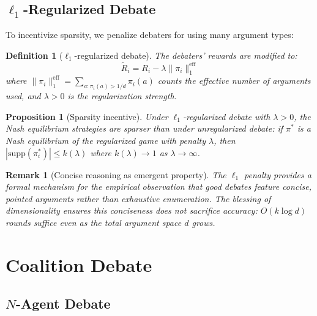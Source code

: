 \documentclass[11pt,a4paper]{article}
\newtheorem{proposition}[theorem]{Proposition}
\newtheorem{definition}[theorem]{Definition}
\newtheorem{remark}[theorem]{Remark}
\newcommand{\norm}[1]{\|#1\|}
\begin{document}
\subsection{$\ell_1$-Regularized Debate}

To incentivize sparsity, we penalize debaters for using many argument types:

\begin{definition}[$\ell_1$-regularized debate]
The debaters' rewards are modified to:
\begin{equation}\label{eq:l1-debate}
    \tilde{R}_i = R_i - \lambda \norm{\pi_i}_1^{\text{eff}}
\end{equation}
where $\norm{\pi_i}_1^{\text{eff}} = \sum_{a : \pi_i(a) > 1/d} \pi_i(a)$
counts the effective number of arguments used, and $\lambda > 0$ is the
regularization strength.
\end{definition}

\begin{proposition}[Sparsity incentive]
\label{prop:l1-incentive}
Under $\ell_1$-regularized debate with $\lambda > 0$, the Nash
equilibrium strategies are sparser than under unregularized debate:
if $\pi^*$ is a Nash equilibrium of the regularized game with penalty
$\lambda$, then $|\text{supp}(\pi_i^*)| \leq k(\lambda)$ where
$k(\lambda) \to 1$ as $\lambda \to \infty$.
\end{proposition}

\begin{remark}[Concise reasoning as emergent property]
The $\ell_1$ penalty provides a formal mechanism for the empirical
observation that good debates feature concise, pointed arguments rather
than exhaustive enumeration. The blessing of dimensionality ensures
this conciseness does not sacrifice accuracy: $O(k \log d)$ rounds
suffice even as the total argument space $d$ grows.
\end{remark}


\section{Coalition Debate}
\label{sec:coalition}

\subsection{$N$-Agent Debate}
\end{document}
